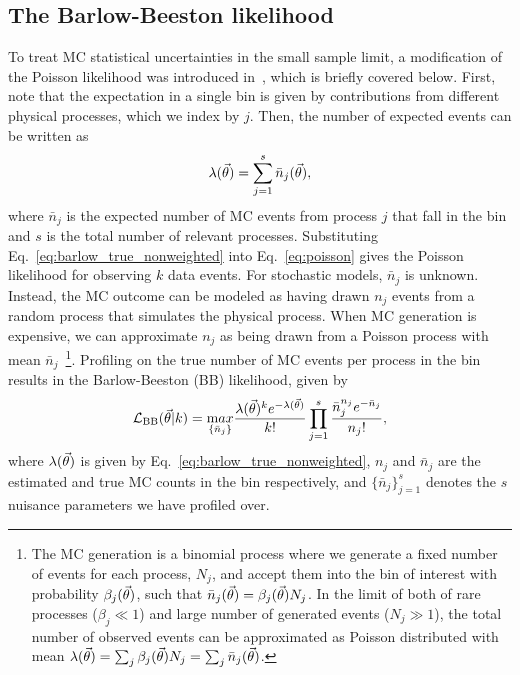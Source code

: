 \subsection{The Barlow-Beeston likelihood}
To treat MC statistical uncertainties in the small sample limit, a modification of the Poisson likelihood was introduced in~\cite{Barlow:1993dm}, which is briefly covered below. First, note that the expectation in a single bin is given by contributions from different physical processes, which we index by $j$. Then, the number of expected events can be written as
\begin{equation}
\lambda(\vec{\theta}) = \sum_{j=1}^s \bar n_{j}(\vec{\theta}),
\label{eq:barlow_true_nonweighted}
\end{equation}
where $\bar n_{j}$ is the expected number of MC events from process $j$ that fall in the bin and $s$ is the total number of relevant processes. Substituting Eq.~\eqref{eq:barlow_true_nonweighted} into Eq.~\eqref{eq:poisson} gives the Poisson likelihood for observing $k$ data events. For stochastic models, $\bar n_j$ is unknown. Instead, the MC outcome can be modeled as having drawn $n_j$ events from a random process that simulates the physical process. When MC generation is expensive, we can approximate $n_j$ as being drawn from a Poisson process with mean $\bar{n}_j$~\footnote{The MC generation is a binomial process where we generate a fixed number of events for each process, $N_j$, and accept them into the bin of interest with probability $\beta_{j}(\vec{\theta})$, such that $\bar n_{j}(\vec{\theta})=\beta_{j}(\vec{\theta}) N_j$. In the limit of both of rare processes ($\beta_{j} \ll 1$) and large number of generated events ($N_j \gg 1$), the total number of observed events can be approximated as Poisson distributed with mean $\lambda(\vec{\theta}) = \sum_j\beta_{j}(\vec{\theta}) N_j = \sum_j\bar n_{j}(\vec{\theta})$.}. Profiling on the true number of MC events per process in the bin results in the Barlow-Beeston (BB) likelihood, given by~\cite{Barlow:1993dm}
\begin{equation}
\mathcal{L}_{\textmd{BB}}(\vec{\theta}|k) = \underset{\{\bar n_j\}}{\textrm max}
\frac{\lambda(\vec{\theta})^{k}e^{-\lambda(\vec{\theta})}}{k!} \prod_{j=1}^s \frac{\bar n_j^{n_j}e^{-\bar n_j}}{n_j!},
\label{eq:barlow_likelihood_nonweighted}
\end{equation}
where $\lambda(\vec{\theta})$ is given by Eq.~\eqref{eq:barlow_true_nonweighted}, $n_{j}$ and $\bar{n}_{j}$ are the estimated and true MC counts in the bin respectively, and $\{\bar{n}_j\}_{j=1}^{s}$ denotes the $s$ nuisance parameters we have profiled over.

